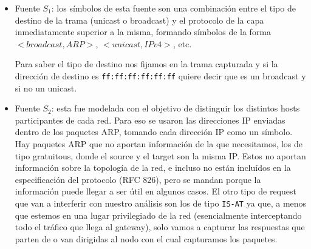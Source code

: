 \begin{itemize}

  \item Fuente $S_1$: los símbolos de esta fuente son una combinación entre el tipo de destino de la trama (unicast o broadcast) y el protocolo de la capa inmediatamente superior a la misma, formando símbolos de la forma $<broadcast, ARP>$, $<unicast, IPv4>$, etc.
  
  Para saber el tipo de destino nos fijamos en la trama capturada y si la dirección de destino es \texttt{ff:ff:ff:ff:ff:ff} quiere decir que es un broadcast y si no un unicast.
  
  \item Fuente $S_2$: esta fue modelada con el objetivo de distinguir los distintos hosts participantes de cada red. Para eso se usaron las direcciones IP enviadas dentro de los paquetes ARP, tomando cada dirección IP como un símbolo. Hay paquetes ARP que no aportan información de la que necesitamos, los de tipo gratuitous, donde el source y el target son la misma IP. Estos no aportan información sobre la topología de la red, e incluso no están incluídos en la especificación del protocolo (RFC 826), pero se mandan porque la información puede llegar a ser útil en algunos casos. El otro tipo de request que van a interferir con nuestro análisis son los de tipo \texttt{IS-AT} ya que, a menos que estemos en una lugar privilegiado de la red (esencialmente interceptando todo el tráfico que llega al gateway), solo vamos a capturar las respuestas que parten de o van dirigidas al nodo con el cual capturamos los paquetes.

\end{itemize}